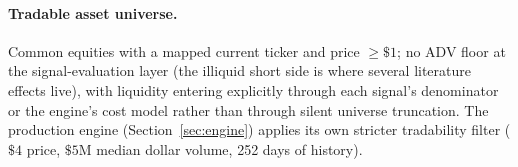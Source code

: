 \paragraph{Tradable asset universe.}
Common equities with a mapped current ticker and price
$\ge\$1$; no ADV floor at the signal-evaluation layer (the
illiquid short side is where several literature effects live), with
liquidity entering explicitly through each signal's denominator or
the engine's cost model rather than through silent universe
truncation. The production engine (Section~\ref{sec:engine}) applies
its own stricter tradability filter ($\$4$ price, $\$5$M median
dollar volume, 252 days of history).
